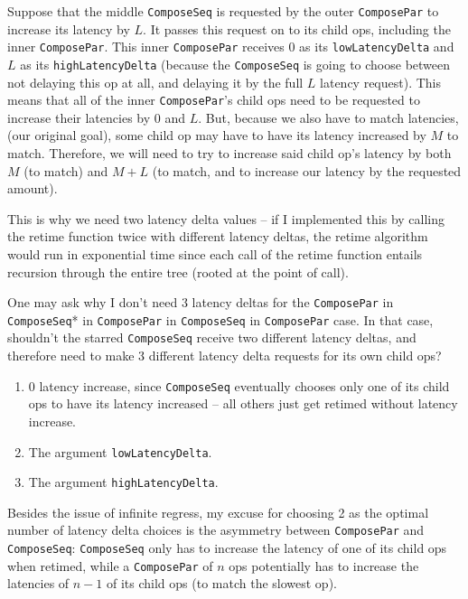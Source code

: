 \documentclass[12pt]{article}
\begin{document}
Suppose that the middle \texttt{ComposeSeq} is requested by the outer
\texttt{ComposePar} to increase its latency by $L$. It passes this
request on to its child ops, including the inner \texttt{ComposePar}.
This inner \texttt{ComposePar} receives 0 as its
\texttt{lowLatencyDelta} and $L$ as its \texttt{highLatencyDelta}
(because the \texttt{ComposeSeq} is going to choose between not
delaying this op at all, and delaying it by the full $L$ latency
request). This means that all of the inner \texttt{ComposePar}'s child
ops need to be requested to increase their latencies by 0 and
$L$. But, because we also have to match latencies, (our original
goal), some child op may have to have its latency increased by $M$ to
match. Therefore, we will need to try to increase said child op's
latency by both $M$ (to match) and $M+L$ (to match, and to increase
our latency by the requested amount).

This is why we need two latency delta values -- if I implemented this
by calling the retime function twice with different latency deltas,
the retime algorithm would run in exponential time since each call of
the retime function entails recursion through the entire tree (rooted
at the point of call).

One may ask why I don't need 3 latency deltas for the
\texttt{ComposePar} in \texttt{ComposeSeq}* in \texttt{ComposePar} in
\texttt{ComposeSeq} in \texttt{ComposePar} case. In that case,
shouldn't the starred \texttt{ComposeSeq} receive two different latency
deltas, and therefore need to make 3 different latency delta requests for
its own child ops?
\begin{enumerate}
\item 0 latency increase, since \texttt{ComposeSeq} eventually chooses
  only one of its child ops to have its latency increased -- all others
  just get retimed without latency increase.
\item The argument \texttt{lowLatencyDelta}.
\item The argument \texttt{highLatencyDelta}.
\end{enumerate}

Besides the issue of infinite regress, my excuse for choosing 2 as the
optimal number of latency delta choices is the asymmetry between
\texttt{ComposePar} and \texttt{ComposeSeq}: \texttt{ComposeSeq} only
has to increase the latency of one of its child ops when retimed,
while a \texttt{ComposePar} of $n$ ops potentially has to increase
the latencies of $n-1$ of its child ops (to match the slowest op).
\end{document}
